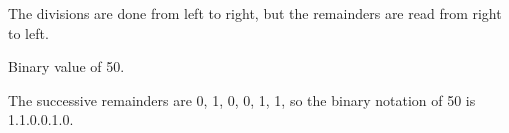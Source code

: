 \documentclass[11pt,class=report,crop=false]{standalone}
\begin{document}
\begin{cours}
\begin{exemple}
The divisions are done from left to right, but the remainders are read from right to left.

\end{exemple}

\begin{exemple}
Binary value of 50.


The successive remainders are 0, 1, 0, 0, 1, 1, so the binary notation of 50 is 1.1.0.0.1.0.
\end{exemple}


\end{cours}



\end{document}
